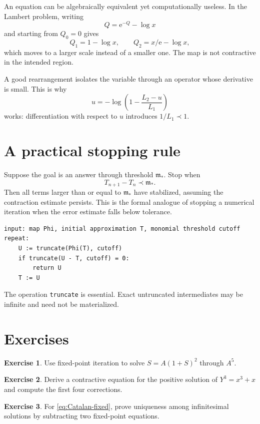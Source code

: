 \documentclass[11pt,openany]{book}
\theoremstyle{definition}
\newtheorem{exercise}{Exercise}[chapter]
\theoremstyle{plain}
\theoremstyle{remark}
\newcommand{\m}{\mathfrak{m}}
\newcommand{\e}{\mathrm{e}}
\newcommand{\precdom}{\prec}
\begin{document}
An equation can be algebraically equivalent yet computationally useless. In the Lambert problem, writing
\[
 Q=\e^{-Q}-\log x
\]
and starting from $Q_0=0$ gives
\[
 Q_1=1-\log x,
 \qquad
 Q_2=x/\e-\log x,
\]
which moves to a larger scale instead of a smaller one. The map is not contractive in the intended region.

A good rearrangement isolates the variable through an operator whose derivative is small. This is why
\[
 u=-\log\left(1-\frac{L_2-u}{L_1}\right)
\]
works: differentiation with respect to $u$ introduces $1/L_1\precdom1$.

\section{A practical stopping rule}

Suppose the goal is an answer through threshold $\m_*$. Stop when
\[
 T_{n+1}-T_n\precdom\m_*.
\]
Then all terms larger than or equal to $\m_*$ have stabilized, assuming the contraction estimate persists. This is the formal analogue of stopping a numerical iteration when the error estimate falls below tolerance.

\begin{lstlisting}[style=pseudo,caption={Dominance-driven fixed-point iteration}]
input: map Phi, initial approximation T, monomial threshold cutoff
repeat:
    U := truncate(Phi(T), cutoff)
    if truncate(U - T, cutoff) = 0:
        return U
    T := U
\end{lstlisting}

The operation \texttt{truncate} is essential. Exact untruncated intermediates may be infinite and need not be materialized.

\section{Exercises}

\begin{exercise}
Use fixed-point iteration to solve $S=A(1+S)^2$ through $A^5$.
\end{exercise}

\begin{exercise}
Derive a contractive equation for the positive solution of $Y^3=x^3+x$ and compute the first four corrections.
\end{exercise}

\begin{exercise}
For \cref{eq:Catalan-fixed}, prove uniqueness among infinitesimal solutions by subtracting two fixed-point equations.
\end{exercise}
\end{document}

